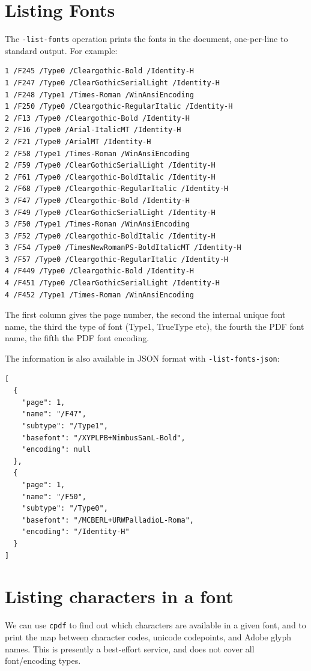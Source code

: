 \documentclass{book}
\begin{document}
\section{Listing Fonts}

\label{listingfonts}
  The \texttt{-list-fonts} operation prints the fonts in the document,
one-per-line to standard output. For example:
{\small\begin{framed}\small\begin{verbatim}1 /F245 /Type0 /Cleargothic-Bold /Identity-H
1 /F247 /Type0 /ClearGothicSerialLight /Identity-H
1 /F248 /Type1 /Times-Roman /WinAnsiEncoding
1 /F250 /Type0 /Cleargothic-RegularItalic /Identity-H
2 /F13 /Type0 /Cleargothic-Bold /Identity-H
2 /F16 /Type0 /Arial-ItalicMT /Identity-H
2 /F21 /Type0 /ArialMT /Identity-H
2 /F58 /Type1 /Times-Roman /WinAnsiEncoding
2 /F59 /Type0 /ClearGothicSerialLight /Identity-H
2 /F61 /Type0 /Cleargothic-BoldItalic /Identity-H
2 /F68 /Type0 /Cleargothic-RegularItalic /Identity-H
3 /F47 /Type0 /Cleargothic-Bold /Identity-H
3 /F49 /Type0 /ClearGothicSerialLight /Identity-H
3 /F50 /Type1 /Times-Roman /WinAnsiEncoding
3 /F52 /Type0 /Cleargothic-BoldItalic /Identity-H
3 /F54 /Type0 /TimesNewRomanPS-BoldItalicMT /Identity-H
3 /F57 /Type0 /Cleargothic-RegularItalic /Identity-H
4 /F449 /Type0 /Cleargothic-Bold /Identity-H
4 /F451 /Type0 /ClearGothicSerialLight /Identity-H
4 /F452 /Type1 /Times-Roman /WinAnsiEncoding
\end{verbatim}
\end{framed}}

\noindent The first column gives the page number, the second the internal unique font
name, the third the type of font (Type1, TrueType etc), the fourth the PDF font
name, the fifth the PDF font encoding.

The information is also available in JSON format with \texttt{-list-fonts-json}:
{\small\begin{framed}\small\begin{verbatim}[
  {
    "page": 1,
    "name": "/F47",
    "subtype": "/Type1",
    "basefont": "/XYPLPB+NimbusSanL-Bold",
    "encoding": null
  },
  {
    "page": 1,
    "name": "/F50",
    "subtype": "/Type0",
    "basefont": "/MCBERL+URWPalladioL-Roma",
    "encoding": "/Identity-H"
  }
]
\end{verbatim}
\end{framed}}


\section{Listing characters in a font}
We can use \texttt{cpdf} to find out which characters are available in a given font, and to print the map between character codes, unicode codepoints, and Adobe glyph names. This is presently a best-effort service, and does not cover all font/encoding types.
\end{document}
